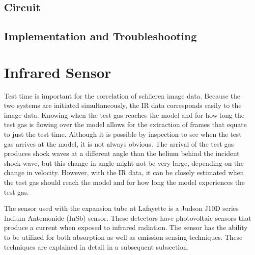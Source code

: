 
\subsection{Circuit}




\subsection{Implementation and Troubleshooting}





\section{Infrared Sensor}

Test time is important for the correlation of schlieren image data. Because the two systems are initiated simultaneously, the IR data corresponds easily to the image data. Knowing when the test gas reaches the model and for how long the test gas is flowing over the model allows for the extraction of frames that equate to just the test time. Although it is possible by inspection to see when the test gas arrives at the model, it is not always obvious. The arrival of the test gas produces shock waves at a different angle than the helium behind the incident shock wave, but this change in angle might not be very large, depending on the change in velocity. However, with the IR data, it can be closely estimated when the test gas should reach the model and for how long the model experiences the test gas. 

The sensor used with the expansion tube at Lafayette is a Judson J10D series Indium Antemonide (InSb) sensor. These detectors have photovoltaic sensors that produce a current when exposed to infrared radiation. The sensor has the ability to be utilized for both absorption as well as emission sensing techniques. These techniques are explained in detail in a subsequent subsection.

